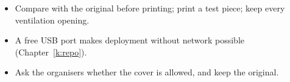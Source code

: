 \begin{keyidea}
\begin{itemize}[nosep]
  \item Compare with the original before printing; print a test piece; keep every ventilation opening.
  \item A free USB port makes deployment without network possible (Chapter~\ref{k:repo}).
  \item Ask the organisers whether the cover is allowed, and keep the original.
\end{itemize}
\end{keyidea}
